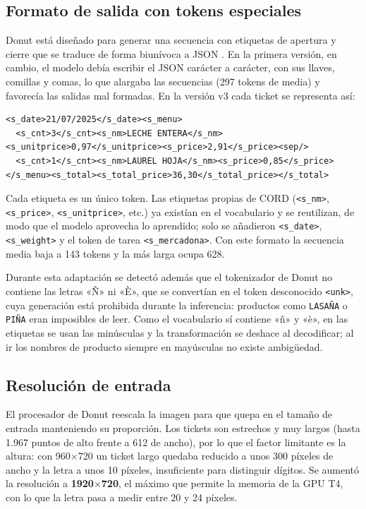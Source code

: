 \subsection{Formato de salida con tokens especiales}
Donut está diseñado para generar una secuencia con etiquetas de apertura y cierre que se traduce de forma biunívoca a JSON \parencite{kim2021donut}. En la primera versión, en cambio, el modelo debía escribir el JSON carácter a carácter, con sus llaves, comillas y comas, lo que alargaba las secuencias (297 tokens de media) y favorecía las salidas mal formadas. En la versión v3 cada ticket se representa así:

\begin{lstlisting}[caption=Representación de un ticket con tokens especiales., label=lst:tokens]
<s_date>21/07/2025</s_date><s_menu>
  <s_cnt>3</s_cnt><s_nm>LECHE ENTERA</s_nm><s_unitprice>0,97</s_unitprice><s_price>2,91</s_price><sep/>
  <s_cnt>1</s_cnt><s_nm>LAUREL HOJA</s_nm><s_price>0,85</s_price>
</s_menu><s_total><s_total_price>36,30</s_total_price></s_total>
\end{lstlisting}

Cada etiqueta es un único token. Las etiquetas propias de CORD (\texttt{<s\_nm>}, \texttt{<s\_price>}, \texttt{<s\_unitprice>}, etc.) ya existían en el vocabulario y se reutilizan, de modo que el modelo aprovecha lo aprendido; solo se añadieron \texttt{<s\_date>}, \texttt{<s\_weight>} y el token de tarea \texttt{<s\_mercadona>}. Con este formato la secuencia media baja a 143 tokens y la más larga ocupa 628.

Durante esta adaptación se detectó además que el tokenizador de Donut no contiene las letras «Ñ» ni «È», que se convertían en el token desconocido \texttt{<unk>}, cuya generación está prohibida durante la inferencia: productos como \texttt{LASAÑA} o \texttt{PIÑA} eran imposibles de leer. Como el vocabulario sí contiene «ñ» y «è», en las etiquetas se usan las minúsculas y la transformación se deshace al decodificar; al ir los nombres de producto siempre en mayúsculas no existe ambigüedad.

\subsection{Resolución de entrada}
El procesador de Donut reescala la imagen para que quepa en el tamaño de entrada manteniendo su proporción. Los tickets son estrechos y muy largos (hasta 1.967 puntos de alto frente a 612 de ancho), por lo que el factor limitante es la altura: con 960$\times$720 un ticket largo quedaba reducido a unos 300 píxeles de ancho y la letra a unos 10 píxeles, insuficiente para distinguir dígitos. Se aumentó la resolución a \textbf{1920$\times$720}, el máximo que permite la memoria de la GPU T4, con lo que la letra pasa a medir entre 20 y 24 píxeles.

